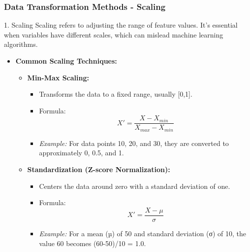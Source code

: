 \documentclass[aspectratio=169]{beamer}
\begin{document}
\begin{frame}[fragile]
    \frametitle{Data Transformation Methods - Scaling}
    \begin{block}{1. Scaling}
        Scaling refers to adjusting the range of feature values. It's essential when variables have different scales, which can mislead machine learning algorithms.
    \end{block}
    \begin{itemize}
        \item \textbf{Common Scaling Techniques:}
        \begin{itemize}
            \item \textbf{Min-Max Scaling:}
            \begin{itemize}
                \item Transforms the data to a fixed range, usually [0,1].
                \item Formula: 
                \begin{equation}
                    X' = \frac{X - X_{min}}{X_{max} - X_{min}}
                \end{equation}
                \item \textit{Example:} For data points 10, 20, and 30, they are converted to approximately 0, 0.5, and 1.
            \end{itemize}
            \item \textbf{Standardization (Z-score Normalization):}
            \begin{itemize}
                \item Centers the data around zero with a standard deviation of one.
                \item Formula:
                \begin{equation}
                    X' = \frac{X - \mu}{\sigma}
                \end{equation}
                \item \textit{Example:} For a mean (µ) of 50 and standard deviation (σ) of 10, the value 60 becomes (60-50)/10 = 1.0.
            \end{itemize}
        \end{itemize}
    \end{itemize}
\end{frame}
\end{document}
